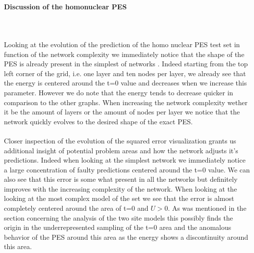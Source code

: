 \documentclass[]{article}
\begin{document}
\paragraph{Discussion of the homonuclear PES}
\\
\\
Looking at the evolution of the prediction of the homo nuclear PES test set in function of the network complexity we immediately notice that the shape of the PES is already present in the simplest of networks . Indeed starting from the top left corner of the grid, i.e. one layer and ten nodes per layer, we already see that the energy is centered around the t=0 value and decreases when we increase this parameter. However we do note that the energy tends to decrease quicker in comparison to the other graphs. When increasing the network complexity wether it be the amount of layers or the amount of nodes per layer we notice that the network quickly evolves to the desired shape of the exact PES.
\\
\\
Closer inspection of the evolution of the squared error visualization grants us additional insight of potential problem areas and how the network adjusts it's predictions.
Indeed when looking at the simplest network we immediately notice a large concentration of faulty predictions centered around the t=0 value. We can also see that this error is some what present in all the networks but definitely improves with the increasing complexity of the network. When looking at the looking at the most complex model of the set we see that the error is almost completely centered around the area of t=0 and $U>0$. As was mentioned in the section concerning the analysis of the two site models this possibly finds the origin in the underrepresented sampling of the t=0 area and the anomalous behavior of the PES around this area as the energy shows a discontinuity around this area.
\end{document}
